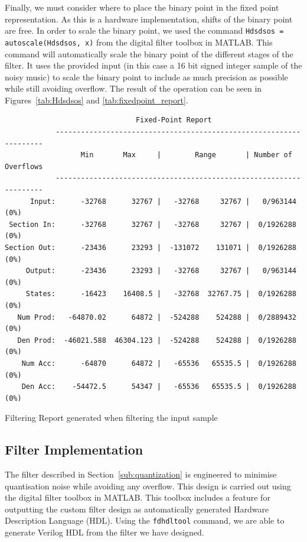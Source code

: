 \documentclass[]{article}
\begin{document}
Finally, we must consider where to place the binary point in the fixed point representation. As this is a hardware implementation, shifts of the binary point are free. In order to scale the binary point, we used the command \verb"Hdsdsos = autoscale(Hdsdsos, x)" from the digital filter toolbox in MATLAB.
This command will automatically scale the binary point of the different stages of the filter. It uses the provided input (in this case a 16 bit signed integer sample of the noisy music) to scale the binary point to include as much precision as possible while still avoiding overflow. The result of the operation can be seen in Figures~\ref{tab:Hdsdsos} and \ref{tab:fixedpoint_report}.

\begin{table}[htbp]
	\begin{center}
		\begin{lstlisting}
                               Fixed-Point Report                                          
            -------------------------------------------------------------------
                  Min       Max     |        Range       | Number of Overflows
            -------------------------------------------------------------------
      Input:      -32768      32767 |   -32768     32767 |   0/963144 (0%)
 Section In:      -32768      32767 |   -32768     32767 |  0/1926288 (0%)
Section Out:      -23436      23293 |  -131072    131071 |  0/1926288 (0%)
     Output:      -23436      23293 |   -32768     32767 |   0/963144 (0%)
     States:      -16423    16408.5 |   -32768  32767.75 |  0/1926288 (0%)
   Num Prod:   -64870.02      64872 |  -524288    524288 |  0/2889432 (0%)
   Den Prod:  -46021.588  46304.123 |  -524288    524288 |  0/1926288 (0%)
    Num Acc:      -64870      64872 |   -65536   65535.5 |  0/1926288 (0%)
    Den Acc:    -54472.5      54347 |   -65536   65535.5 |  0/1926288 (0%)
		\end{lstlisting}
	\end{center}
	\caption{Filtering Report generated when filtering the input sample}
	\label{tab:fixedpoint_report}
\end{table}



\subsection{Filter Implementation} %
\label{sub:filter_implementation}

The filter described in Section~\ref{sub:quantization} is engineered to minimise quantisation noise while avoiding any overflow. This design is carried out using the digital filter toolbox in MATLAB.
This toolbox includes a feature for outputting the custom filter design as automatically generated Hardware Description Language (HDL).
Using the \verb"fdhdltool" command, we are able to generate Verilog HDL from the filter we have designed.
\end{document}
